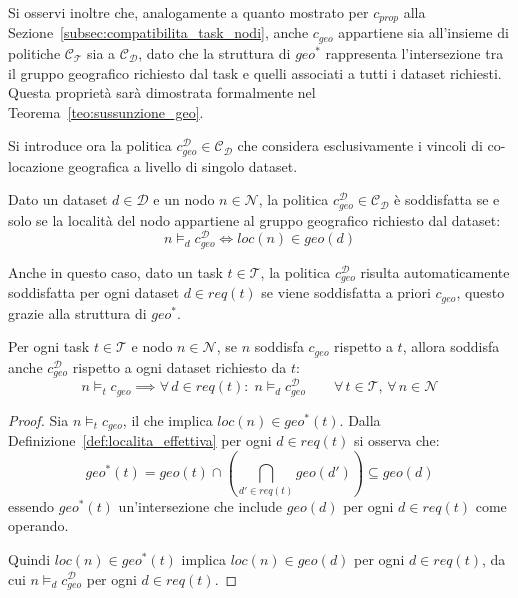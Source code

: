 Si osservi inoltre che, analogamente a quanto mostrato per $c_{prop}$ alla Sezione~\ref{subsec:compatibilita_task_nodi}, anche $c_{geo}$ appartiene sia all'insieme di politiche $\mathcal{C_T}$ sia a $\mathcal{C_D}$, dato che la struttura di $geo^*$ rappresenta l'intersezione tra il gruppo geografico richiesto dal task e quelli associati a tutti i dataset richiesti. Questa proprietà sarà dimostrata formalmente nel Teorema~\ref{teo:sussunzione_geo}.

Si introduce ora la politica $c_{geo}^{\mathcal{D}} \in \mathcal{C_D}$ che considera esclusivamente i vincoli di co-locazione geografica a livello di singolo dataset.

\begin{policy}
    \label{pol:c_geo_dataset}
    Dato un dataset $d \in \mathcal{D}$ e un nodo $n \in \mathcal{N}$, la politica $c_{geo}^{\mathcal{D}} \in \mathcal{C_D}$ è soddisfatta se e solo se la località del nodo appartiene al gruppo geografico richiesto dal dataset:
    \begin{equation}
        n \models_d c_{geo}^{\mathcal{D}}
        \iff
        loc(n) \in geo(d)
    \end{equation}
\end{policy}

Anche in questo caso, dato un task $t \in \mathcal{T}$, la politica $c_{geo}^{\mathcal{D}}$ risulta automaticamente soddisfatta per ogni dataset $d \in req(t)$ se viene soddisfatta a priori $c_{geo}$, questo grazie alla struttura di $geo^*$.

\begin{theorem}
\label{teo:sussunzione_geo}
    Per ogni task $t \in \mathcal{T}$ e nodo $n \in \mathcal{N}$, se $n$ soddisfa $c_{geo}$ rispetto a $t$, allora soddisfa anche $c_{geo}^{\mathcal{D}}$ rispetto a ogni dataset richiesto da $t$:
    \begin{equation}
        n \models_t c_{geo}
        \implies
        \forall\, d \in req(t) :\; n \models_d c_{geo}^{\mathcal{D}}
        \qquad
        \forall\, t \in \mathcal{T},\, \forall\, n \in \mathcal{N}
    \end{equation}
    \begin{proof}
        Sia $n \models_t c_{geo}$, il che implica $loc(n) \in geo^*(t)$. Dalla Definizione~\ref{def:localita_effettiva} per ogni $d \in req(t)$ si osserva che:
        \begin{equation}
            geo^*(t) = geo(t) \cap \left( \bigcap_{d' \in req(t)} geo(d') \right) \subseteq geo(d)
        \end{equation}
        essendo $geo^*(t)$ un'intersezione che include $geo(d)$ per ogni $d \in req(t)$ come operando. 
        
        Quindi $loc(n) \in geo^*(t)$ implica $loc(n) \in geo(d)$ per ogni $d \in req(t)$, da cui $n \models_d c_{geo}^{\mathcal{D}}$ per ogni $d \in req(t)$.
    \end{proof}
\end{theorem}

